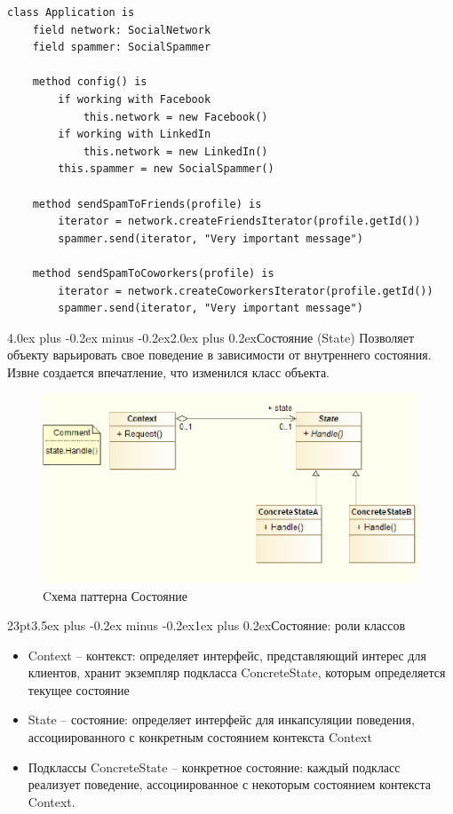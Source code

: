 \documentclass[12pt, a4paper]{book}%
\makeatletter
\renewcommand{\section}{\@startsection{section}{1}{1pt}%
{4.0ex plus -0.2ex minus -0.2ex}{2.0ex plus 0.2ex}{\centering\bf}}%
\renewcommand{\subsection}{\@startsection{subsection}{2}%
{23pt}{3.5ex plus -0.2ex minus -0.2ex}{1ex plus 0.2ex}{\bf}}%
\makeatother
\begin{document}
{\begin{lstlisting}
class Application is
    field network: SocialNetwork
    field spammer: SocialSpammer

    method config() is
        if working with Facebook
            this.network = new Facebook()
        if working with LinkedIn
            this.network = new LinkedIn()
        this.spammer = new SocialSpammer()

    method sendSpamToFriends(profile) is
        iterator = network.createFriendsIterator(profile.getId())
        spammer.send(iterator, "Very important message")

    method sendSpamToCoworkers(profile) is
        iterator = network.createCoworkersIterator(profile.getId())
        spammer.send(iterator, "Very important message")
\end{lstlisting}

\section{Состояние (State)}
Позволяет объекту варьировать свое поведение в зависимости от внутреннего
состояния. Извне создается впечатление, что изменился класс объекта.
\begin{figure}[!ht]
\begin{center}
\includegraphics[scale=0.7]{images/pic/pic28-3.png}\caption{Cхема паттерна Состояние}\label{figure1}
\end{center}
\end{figure}
\subsection{Состояние: роли классов}
\begin{itemize}
    \item Context – контекст: определяет интерфейс, представляющий интерес для клиентов, хранит экземпляр подкласса ConcreteState, которым определяется текущее состояние
     \item State – состояние: определяет интерфейс для инкапсуляции поведения, ассоциированного с конкретным состоянием контекста Context
     \item Подклассы ConcreteState – конкретное состояние: каждый подкласс реализует поведение, ассоциированное с некоторым состоянием контекста Context.
\end{itemize}
}
\end{document}
